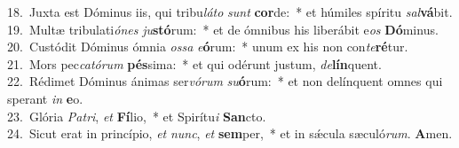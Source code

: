 {18.~}Juxta est Dóminus iis, qui tribu\textit{lá}\textit{to} \textit{sunt} \textbf{cor}de:~* et húmiles spíritu \textit{sal}\textbf{vá}bit.\\
{19.~}Multæ tribulati\textit{ó}\textit{nes} \textit{ju}\textbf{stó}rum:~* et de ómnibus his liberábit e\textit{os} \textbf{Dó}minus.\\
{20.~}Custódit Dóminus ómnia \textit{os}\textit{sa} \textit{e}\textbf{ó}rum:~* unum ex his non con\textit{te}\textbf{ré}tur.\\
{21.~}Mors pec\textit{ca}\textit{tó}\textit{rum} \textbf{pés}sima:~* et qui odérunt justum, \textit{de}\textbf{lín}quent.\\
{22.~}Rédimet Dóminus ánimas ser\textit{vó}\textit{rum} \textit{su}\textbf{ó}rum:~* et non delínquent omnes qui sperant \textit{in} \textbf{e}o.\\
{23.~}Glória \textit{Pa}\textit{tri}, \textit{et} \textbf{Fí}lio,~* et Spirítu\textit{i} \textbf{San}cto.\\
{24.~}Sicut erat in princípio, \textit{et} \textit{nunc}, \textit{et} \textbf{sem}per,~* et in sǽcula sæculó\textit{rum}. \textbf{A}men.\\
